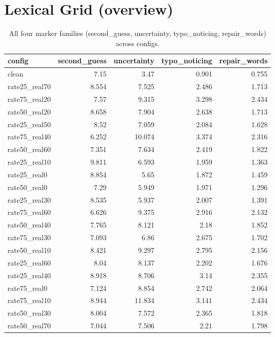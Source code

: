 \documentclass[11pt]{article}
\begin{document}

\section*{Lexical Grid (overview)}
\begin{table}[H]
\centering
\caption{All four marker families (second\_guess, uncertainty, typo\_noticing, repair\_words) across configs.}
\small
\begin{adjustbox}{max width=\textwidth}
\begin{tabular}{lrrrr}
\toprule
\textbf{config} & \textbf{second\_guess} & \textbf{uncertainty} & \textbf{typo\_noticing} & \textbf{repair\_words} \\
\midrule
clean & 7.15 & 3.47 & 0.901 & 0.755 \\
rate25\_real70 & 8.554 & 7.525 & 2.486 & 1.713 \\
rate75\_real20 & 7.57 & 9.315 & 3.298 & 2.434 \\
rate50\_real20 & 8.658 & 7.904 & 2.638 & 1.713 \\
rate25\_real50 & 8.52 & 7.059 & 2.084 & 1.628 \\
rate75\_real40 & 6.252 & 10.074 & 3.374 & 2.316 \\
rate50\_real60 & 7.351 & 7.634 & 2.419 & 1.822 \\
rate25\_real10 & 9.811 & 6.593 & 1.959 & 1.363 \\
rate25\_real0 & 8.854 & 5.65 & 1.872 & 1.459 \\
rate50\_real0 & 7.29 & 5.949 & 1.971 & 1.296 \\
rate25\_real30 & 8.535 & 5.937 & 2.007 & 1.391 \\
rate75\_real60 & 6.626 & 9.375 & 2.916 & 2.132 \\
rate50\_real40 & 7.765 & 8.121 & 2.18 & 1.852 \\
rate75\_real30 & 7.093 & 6.86 & 2.675 & 1.702 \\
rate50\_real10 & 8.421 & 9.297 & 2.795 & 2.156 \\
rate25\_real60 & 8.04 & 8.137 & 2.202 & 1.676 \\
rate25\_real40 & 8.918 & 8.706 & 3.14 & 2.355 \\
rate75\_real0 & 7.124 & 8.854 & 2.742 & 2.064 \\
rate75\_real10 & 8.944 & 11.834 & 3.141 & 2.434 \\
rate50\_real30 & 8.004 & 7.572 & 2.365 & 1.818 \\
rate50\_real70 & 7.044 & 7.506 & 2.21 & 1.798 \\

\end{tabular}
\end{adjustbox}
\end{table}
\end{document}
